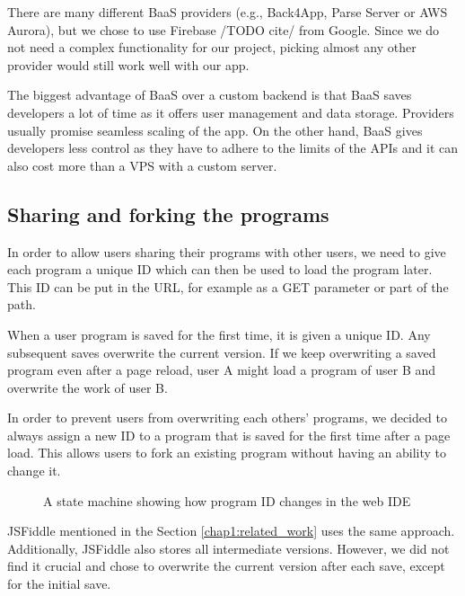 There are many different BaaS providers (e.g., Back4App, Parse Server or AWS Aurora), but we chose to use Firebase /TODO cite/ from Google. Since we do not
need a complex functionality for our project, picking almost any other provider would still work well with our app.

The biggest advantage of BaaS over a custom backend is that BaaS saves developers a lot of time as it offers user management and data storage.
Providers usually promise seamless scaling of the app. On the other hand, BaaS gives developers less control as they have to adhere to the limits of the APIs
and it can also cost more than a VPS with a custom server.

\subsection{Sharing and forking the programs}
\label{chap2:program_id}

In order to allow users sharing their programs with other users, we need to give each program a unique ID which can then be used to load the program later.
This ID can be put in the URL, for example as a GET parameter or part of the path.

When a user program is saved for the first time, it is given a unique ID. Any subsequent saves overwrite the current version. If we keep overwriting
a saved program even after a page reload, user A might load a program of user B and overwrite the work of user B.

In order to prevent users from overwriting each others' programs, we decided to always assign a new ID to a program that is saved for the first time after
a page load. This allows users to fork an existing program without having an ability to change it.

\begin{figure}[!hbt]
    \centering
	\caption{A state machine showing how program ID changes in the web IDE}
	\label{fig:chap2:page_url}
\end{figure}

JSFiddle mentioned in the Section \ref{chap1:related_work} uses the same approach. Additionally, JSFiddle also stores all intermediate versions. However,
we did not find it crucial and chose to overwrite the current version after each save, except for the initial save.
